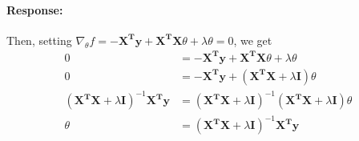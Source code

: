 \documentclass [11pt] {article}
\newcommand{\T}{\bf{T}}
\newcommand{\X}{\bf{X}}
\newcommand{\y}{\bf{y}}
\newenvironment{response}{\begin{responseframe}\vspace{-10pt}\paragraph{Response:}}{\end{responseframe}}
\renewcommand{\bf}[1]{\textbf{{#1}}}
\begin{document}
\begin{enumerate}
\begin{adjustwidth}{-8.4em}{-6em}
\begin{response}
                Then, setting $\nabla_{\theta} f = - \X^{\T} \y + \X^{\T} \X \theta + \lambda \theta = 0$, we get
                \begin{align*}
                    0 &= -\X^{\T} \y + \X^{\T} \X \theta + \lambda \theta \\
                    0 &= -\X^{\T} \y + \left( \X^{\T} \X + \lambda \bf{I} \right) \theta \\
                    \left( \X^{\T} \X + \lambda \bf{I} \right)^{-1} \X^{\T} \y &= \left( \X^{\T} \X + \lambda \bf{I} \right)^{-1} \left( \X^{\T} \X + \lambda \bf{I} \right) \theta \\
                    \theta &= \left( \X^{\T} \X + \lambda \bf{I} \right)^{-1} \X^{\T} \y
                \end{align*}
            \end{response}
        \end{adjustwidth}
\end{enumerate}
\end{document}
